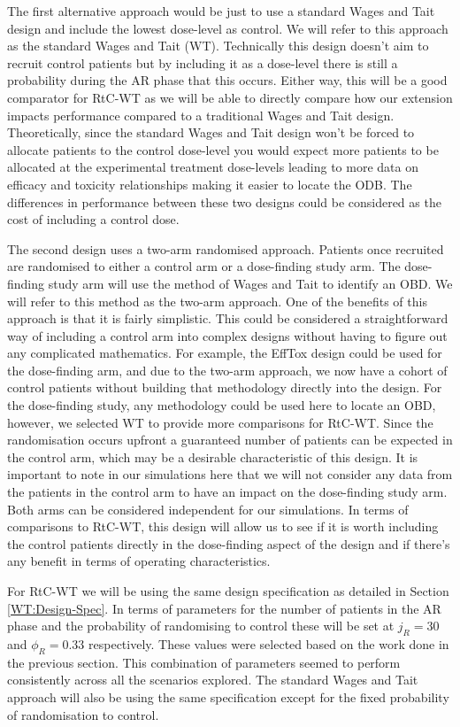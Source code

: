 The first alternative approach would be just to use a standard Wages and Tait design and include the lowest dose-level as control. We will refer to this approach as the standard Wages and Tait (WT). Technically this design doesn't aim to recruit control patients but by including it as a dose-level there is still a probability during the AR phase that this occurs. Either way, this will be a good comparator for RtC-WT as we will be able to directly compare how our extension impacts performance compared to a traditional Wages and Tait design. Theoretically, since the standard Wages and Tait design won't be forced to allocate patients to the control dose-level you would expect more patients to be allocated at the experimental treatment dose-levels leading to more data on efficacy and toxicity relationships making it easier to locate the ODB. The differences in performance between these two designs could be considered as the cost of including a control dose. 

The second design uses a two-arm randomised approach. Patients once recruited are randomised to either a control arm or a dose-finding study arm. The dose-finding study arm will use the method of Wages and Tait to identify an OBD. We will refer to this method as the two-arm approach. One of the benefits of this approach is that it is fairly simplistic. This could be considered a straightforward way of including a control arm into complex designs without having to figure out any complicated mathematics. For example, the EffTox design could be used for the dose-finding arm, and due to the two-arm approach, we now have a cohort of control patients without building that methodology directly into the design. For the dose-finding study, any methodology could be used here to locate an OBD, however, we selected WT to provide more comparisons for RtC-WT. Since the randomisation occurs upfront a guaranteed number of patients can be expected in the control arm, which may be a desirable characteristic of this design. It is important to note in our simulations here that we will not consider any data from the patients in the control arm to have an impact on the dose-finding study arm. Both arms can be considered independent for our simulations. In terms of comparisons to RtC-WT, this design will allow us to see if it is worth including the control patients directly in the dose-finding aspect of the design and if there's any benefit in terms of operating characteristics.  

For RtC-WT we will be using the same design specification as detailed in Section \ref{WT:Design-Spec}. In terms of parameters for the number of patients in the AR phase and the probability of randomising to control these will be set at $j_R = 30$ and $\phi_R = 0.33 $ respectively. These values were selected based on the work done in the previous section. This combination of parameters seemed to perform consistently across all the scenarios explored. The standard Wages and Tait approach will also be using the same specification except for the fixed probability of randomisation to control.

